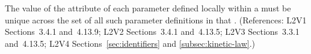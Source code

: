 The value of the  attribute of each parameter defined locally within
a \KineticLaw must be unique across the set of all such parameter
definitions in that \KineticLaw.  (References: L2V1 Sections~3.4.1 and~4.13.9;
L2V2 Sections~3.4.1 and~4.13.5; L2V3 Sections~3.3.1 and~4.13.5;
L2V4 Sections~\ref{sec:identifiers} and \ref{subsec:kinetic-law}.)

